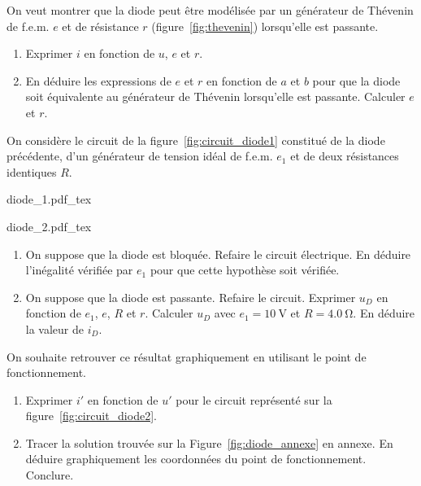 \documentclass[a4paper, 10pt, garamond, oneside]{book}
\begin{document}
{	On veut montrer que la diode peut être modélisée par un générateur de
	Thévenin de f.e.m. $e$ et de résistance $r$ (figure~\ref{fig:thevenin})
	lorsqu'elle est passante.
	\begin{enumerate}
		\item Exprimer $i$ en fonction de $u$, $e$ et $r$.
		\item En déduire les expressions de $e$ et $r$ en fonction de $a$ et $b$
		      pour que la diode soit équivalente au générateur de Thévenin lorsqu'elle
		      est passante. Calculer $e$ et $r$.
	\end{enumerate}
	On considère le circuit de la figure~\ref{fig:circuit_diode1} constitué de la
	diode précédente, d'un générateur de tension idéal de f.e.m. $e_1$ et de deux
	résistances identiques $R$.
	\smallbreak
	\noindent
	\begin{minipage}[t]{.5\linewidth}
		\begin{center}
			{diode_1.pdf_tex}
			\label{fig:circuit_diode1}
		\end{center}
	\end{minipage}
	\begin{minipage}[t]{.5\linewidth}
		\begin{center}
			{diode_2.pdf_tex}
			\label{fig:circuit_diode2}
		\end{center}
	\end{minipage}
	\begin{enumerate}
		\item On suppose que la diode est bloquée. Refaire le circuit électrique.
		      En déduire l'inégalité vérifiée par $e_1$ pour que cette hypothèse soit
		      vérifiée.
		\item On suppose que la diode est passante. Refaire le circuit. Exprimer
		      $u_D$ en fonction de $e_1$, $e$, $R$ et $r$. Calculer $u_D$ avec
		      $e_1=\SI{10}{\volt}$ et $R=\SI{4.0}{\ohm}$. En déduire la valeur de $i_D$.
	\end{enumerate}

	On souhaite retrouver ce résultat graphiquement en utilisant le point de
	fonctionnement.
	\begin{enumerate}
		\item Exprimer $i'$ en fonction de $u'$ pour le circuit représenté sur la
		      figure~\ref{fig:circuit_diode2}.
		\item Tracer la solution trouvée sur la Figure~\ref{fig:diode_annexe} en
		      annexe. En déduire graphiquement les coordonnées du point de
		      fonctionnement. Conclure.
	\end{enumerate}
}
\end{document}
